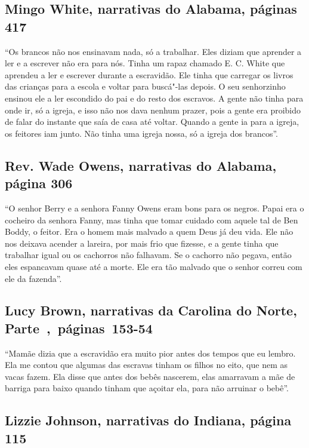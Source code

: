 \subsection{Mingo White, narrativas do Alabama, páginas 417}
\label{ref286}

``Os brancos não nos ensinavam nada, só a trabalhar. Eles diziam que
aprender a ler e a escrever não era para nós. Tinha um rapaz chamado E.
C. White que aprendeu a ler e escrever durante a escravidão. Ele tinha
que carregar os livros das crianças para a escola e voltar para
buscá"-las depois. O seu senhorzinho ensinou ele a ler escondido do pai e
do resto dos escravos. A gente não tinha para onde ir, só a igreja, e
isso não nos dava nenhum prazer, pois a gente era proibido de falar do
instante que saía de casa até voltar. Quando a gente ia para a igreja,
os feitores iam junto. Não tinha uma igreja nossa, só a igreja dos
brancos''.

\subsection{Rev. Wade Owens, narrativas do Alabama, página 306}
\label{ref207}

``O senhor Berry e a senhora Fanny Owens eram bons para os negros. Papai
era o cocheiro da senhora Fanny, mas tinha que tomar cuidado com aquele
tal de Ben Boddy, o feitor. Era o homem mais malvado a quem Deus já deu
vida. Ele não nos deixava acender a lareira, por mais frio que fizesse,
e a gente tinha que trabalhar igual ou os cachorros não falhavam. Se o
cachorro não pegava, então eles espancavam quase até a morte. Ele era
tão malvado que o senhor correu com ele da fazenda''.

\subsection{Lucy Brown, narrativas da Carolina do Norte, Parte~,~páginas~153-54} \label{ref37}

``Mamãe dizia que a escravidão era muito pior antes dos tempos que eu
lembro. Ela me contou que algumas das escravas tinham os filhos no eito,
que nem as vacas fazem. Ela disse que antes dos bebês nascerem, elas
amarravam a mãe de barriga para baixo quando tinham que açoitar ela,
para não arruinar o bebê''.

\subsection{Lizzie Johnson, narrativas do Indiana, página 115}
\label{ref163}

